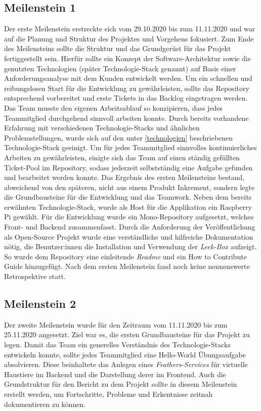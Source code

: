 \documentclass[10pt, a4paper]{article}
\begin{document}
\begin{onehalfspace}
\subsection{Meilenstein 1}
Der erste Meilenstein erstreckte sich vom 29.10.2020 bis zum 11.11.2020 und war auf die Planung und Struktur des Projektes und Vorgehens fokusiert.
Zum Ende des Meilensteins sollte die Struktur und das Grundgerüst für das Projekt fertiggestellt sein.
Hierfür sollte ein Konzept der Software-Architektur sowie die genutzten Technologien (später Technologie-Stack genannt) auf Basis einer Anforderungsanalyse mit dem Kunden entwickelt werden.
Um ein schnellen und reibungslosen Start für die Entwicklung zu gewährleisten, sollte das Repository entsprechend vorbereitet und erste Tickets in das Backlog eingetragen werden.
Das Team musste den eigenen Arbeitsablauf so konzipieren, dass jedes Teammitglied durchgehend sinnvoll arbeiten konnte.
Durch bereits vorhandene Erfahrung mit verschiedenen Technologie-Stacks und ähnlichen Problemstellungen, wurde sich auf den unter \autoref{technologien} beschriebenen Technologie-Stack geeinigt.
Um für jedes Teammitglied sinnvolles kontinuierliches Arbeiten zu gewährleisten, einigte sich das Team auf einen ständig gefüllten Ticket-Pool im Repository, sodass jederzeit selbstständig eine Aufgabe gefunden und bearbeitet werden konnte.
Das Ergebnis des ersten Meilensteins bestand, abweichend von den späteren, nicht aus einem Produkt Inkrement, sondern legte die Grundbausteine für die Entwicklung und das Teamwork.
Neben dem bereits erwähnten Technologie-Stack, wurde als Host für die Applikation ein Raspberry Pi gewählt.
Für die Entwicklung wurde ein Mono-Repository aufgesetzt, welches Front- und Backend zusammenfasst.
Durch die Anforderung der Veröffentlichung als Open-Source Projekt wurde eine verständliche und hilfreiche Dokumentation nötig, die Benutzer:innen die Installation und Verwendung der \textit{Leek-Box} aufzeigt.
So wurde dem Repository eine einleitende \textit{Readme} und ein \glqq How to Contribute\grqq{} Guide hinzugefügt.
Nach dem ersten Meilenstein fand noch keine nennenswerte Retrospektive statt.

\subsection{Meilenstein 2}
Der zweite Meilenstein wurde für den Zeitraum vom 11.11.2020 bis zum 25.11.2020 angesetzt.
Ziel war es, die ersten Grundbausteine für das Projekt zu legen. Damit das Team ein generelles Verständnis des Technologie-Stacks entwickeln konnte,
sollte jedes Teammitglied eine \glqq Hello-World\grqq{} Übungsaufgabe absolvieren. Diese beinhaltete das Anlegen eines \textit{Feathers-Services} für virtuelle
Haustiere im Backend und die Darstellung derer im Frontend. Auch die Grundstruktur für den Bericht zu dem Projekt sollte in diesem Meilenstein erstellt werden,
um Fortschritte, Probleme und Erkentnisse zeitnah dokumentieren zu können.
\\~\\

\end{onehalfspace}
\end{document}
